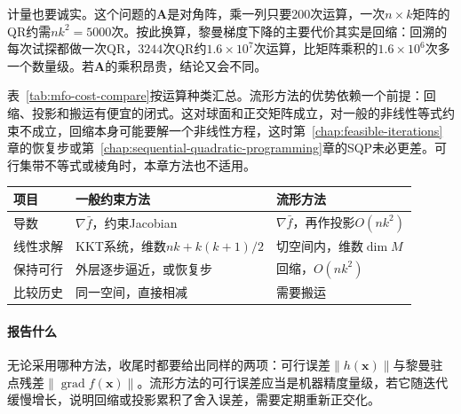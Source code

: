 计量也要诚实。这个问题的$\bm{A}$是对角阵，乘一列只要$200$次运算，一次$n\times k$矩阵的QR约需$nk^2=5000$次。按此换算，黎曼梯度下降的主要代价其实是回缩：回溯的每次试探都做一次QR，$3244$次QR约$1.6\times10^7$次运算，比矩阵乘积的$1.6\times10^6$次多一个数量级。若$\bm{A}$的乘积昂贵，结论又会不同。

表~\ref{tab:mfo-cost-compare}按运算种类汇总。流形方法的优势依赖一个前提：回缩、投影和搬运有便宜的闭式。这对球面和正交矩阵成立，对一般的非线性等式约束不成立，回缩本身可能要解一个非线性方程，这时第~\ref{chap:feasible-iterations}章的恢复步或第~\ref{chap:sequential-quadratic-programming}章的SQP未必更差。可行集带不等式或棱角时，本章方法也不适用。

\begin{BookInlineTable}
 \centering
 \caption{一般约束方法与流形方法的每轮运算对比，$\mathrm{St}(k,n)$上的问题。}
 \label{tab:mfo-cost-compare}
 \begin{tabular}{lll}
  \toprule
  项目 & 一般约束方法 & 流形方法\\
  \midrule
  导数 & $\nabla\bar{f}$，约束Jacobian & $\nabla\bar{f}$，再作投影$O(nk^2)$\\
  线性求解 & KKT系统，维数$nk+k(k+1)/2$ & 切空间内，维数$\dim M$\\
  保持可行 & 外层逐步逼近，或恢复步 & 回缩，$O(nk^2)$\\
  比较历史 & 同一空间，直接相减 & 需要搬运\\
  \bottomrule
 \end{tabular}
\end{BookInlineTable}

\paragraph{报告什么}
无论采用哪种方法，收尾时都要给出同样的两项：可行误差$\lVert h(\bm{x})\rVert$与黎曼驻点残差$\lVert\operatorname{grad}f(\bm{x})\rVert$。流形方法的可行误差应当是机器精度量级，若它随迭代缓慢增长，说明回缩或投影累积了舍入误差，需要定期重新正交化。
